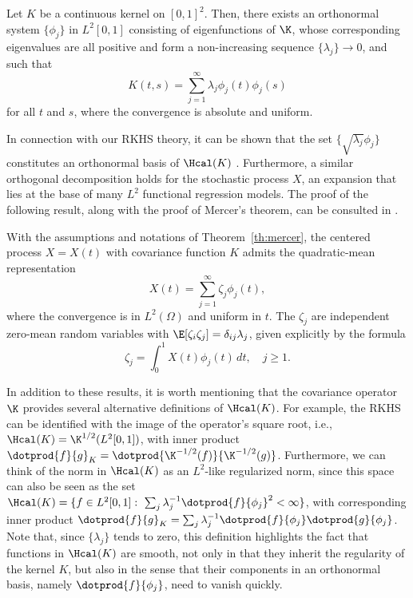 \begin{theorem}\label{th:mercer}
    Let \(K\) be a continuous kernel on \([0,1]^2\). Then, there exists an orthonormal system \(\{\phi_j\}\) in \(L^2[0,1]\) consisting of eigenfunctions of \(\K\), whose corresponding eigenvalues are all positive and form a non-increasing sequence \(\{\lambda_j\}\to 0\), and such that
    \[
      K(t, s) = \sum_{j=1}^\infty \lambda_j \phi_j(t)\phi_j(s)
    \]
    for all \(t\) and \(s\), where the convergence is absolute and uniform.
\end{theorem}

In connection with our RKHS theory, it can be shown that the set \(\{\sqrt{\lambda_j}\phi_j\}\) constitutes an orthonormal basis of \(\Hcal(K)\) \citep[see e.g.][Sec.~4.4]{cucker2007learning}. Furthermore, a similar orthogonal decomposition holds for the stochastic process \(X\), an expansion that lies at the base of many \(L^2\) functional regression models. The proof of the following result, along with the proof of Mercer's theorem, can be consulted in \citet[][Sec.~3.2]{berlinet2004reproducing}.

\begin{theorem}
  With the assumptions and notations of Theorem~\ref{th:mercer}, the centered process \(X=X(t)\) with covariance function \(K\) admits the quadratic-mean representation
  \[
  X(t) = \sum_{j=1}^\infty \zeta_j \phi_j(t),
  \]
  where the convergence is in \(L^2(\Omega)\) and uniform in \(t\). The \(\zeta_j\) are independent zero-mean random variables with \(\E[\zeta_i\zeta_j]=\delta_{ij}\lambda_j\), given explicitly by the formula
  \[
    \zeta_j = \int_0^1 X(t)\phi_j(t)\, dt, \quad j\geq 1.
  \]
\end{theorem}

\enlargethispage{1\baselineskip}

In addition to these results, it is worth mentioning that the covariance operator \(\K\) provides several alternative definitions of \(\Hcal(K)\). For example, the RKHS can be identified with the image of the operator's square root, i.e., \(\Hcal(K) = \K^{1/2}(L^2[0, 1])\), with inner product \(\dotprod{f}{g}_K = \dotprod{\K^{-1/2}(f)}{\K^{-1/2}(g)}\). Furthermore, we can think of the norm in \(\Hcal(K)\) as an \(L^2\)-like regularized norm, since this space can also be seen as the set \(\Hcal(K) = \{f \in L^2[0, 1]: \ \sum_j \lambda_j^{-1}\dotprod{f}{\phi_j}^2 < \infty \}\), with corresponding inner product \(\dotprod{f}{g}_K = \sum_j \lambda_j^{-1}\dotprod{f}{\phi_j}\dotprod{g}{\phi_j}\). Note that, since \(\{\lambda_j\}\) tends to zero, this definition highlights the fact that functions in \(\Hcal(K)\) are smooth, not only in that they inherit the regularity of the kernel \(K\), but also in the sense that their components in an orthonormal basis, namely \(\dotprod{f}{\phi_j}\), need to vanish quickly.

